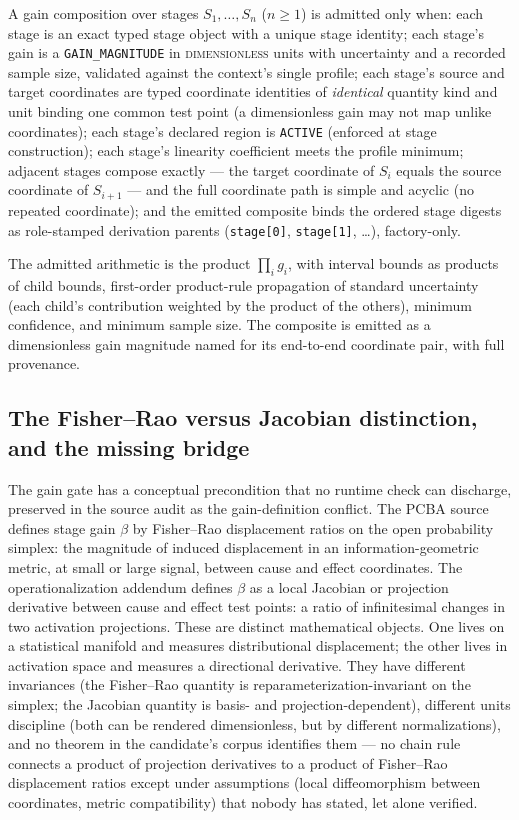 \begin{ruleenv}\label{ch09:rule:gain}
A gain composition over stages $S_1, \ldots, S_n$ ($n \ge 1$) is admitted
only when: each stage is an exact typed stage object with a unique stage
identity; each stage's gain is a \texttt{GAIN\_MAGNITUDE} in
\textsc{dimensionless} units with uncertainty and a recorded sample size,
validated against the context's single profile; each stage's source and
target coordinates are typed coordinate identities of \emph{identical}
quantity kind and unit binding one common test point (a dimensionless gain
may not map unlike coordinates); each stage's declared region is
\texttt{ACTIVE} (enforced at stage construction); each stage's linearity
coefficient meets the profile minimum; adjacent stages compose exactly ---
the target coordinate of $S_i$ equals the source coordinate of $S_{i+1}$
--- and the full coordinate path is simple and acyclic (no repeated
coordinate); and the emitted composite binds the ordered stage digests as
role-stamped derivation parents (\texttt{stage[0]}, \texttt{stage[1]},
\ldots), factory-only.
\end{ruleenv}

The admitted arithmetic is the product $\prod_i g_i$, with interval bounds
as products of child bounds, first-order product-rule propagation of
standard uncertainty (each child's contribution weighted by the product of
the others), minimum confidence, and minimum sample size. The composite is
emitted as a dimensionless gain magnitude named for its end-to-end
coordinate pair, with full provenance.

\subsection{The Fisher--Rao versus Jacobian distinction, and the missing bridge}\label{ch09:sec:gain-bridge}

The gain gate has a conceptual precondition that no runtime check can
discharge, preserved in the source audit as the gain-definition conflict.
The PCBA source defines stage gain $\beta$ by Fisher--Rao displacement
ratios on the open probability simplex: the magnitude of induced
displacement in an information-geometric metric, at small or large signal,
between cause and effect coordinates. The operationalization addendum
defines $\beta$ as a local Jacobian or projection derivative between cause
and effect test points: a ratio of infinitesimal changes in two activation
projections. These are distinct mathematical objects. One lives on a
statistical manifold and measures distributional displacement; the other
lives in activation space and measures a directional derivative. They have
different invariances (the Fisher--Rao quantity is
reparameterization-invariant on the simplex; the Jacobian quantity is
basis- and projection-dependent), different units discipline (both can be
rendered dimensionless, but by different normalizations), and no theorem
in the candidate's corpus identifies them --- no chain rule connects a
product of projection derivatives to a product of Fisher--Rao displacement
ratios except under assumptions (local diffeomorphism between coordinates,
metric compatibility) that nobody has stated, let alone verified.


